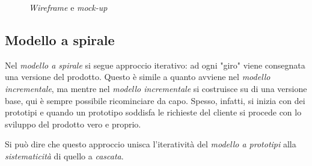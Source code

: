 \documentclass[12pt, a4paper]{report}
\theoremstyle{def}
\theoremstyle{definition}
\begin{document}
\begin{figure}[h]
    \centering
    \hfill
    \caption{\emph{Wireframe} e \emph{mock-up}}
\end{figure}

\newpage
\subsection{Modello a spirale}
Nel \emph{modello a spirale} si segue approccio iterativo: ad ogni "giro" viene
consegnata una versione del prodotto. Questo è simile a quanto avviene nel
\emph{modello incrementale}, ma mentre nel \emph{modello incrementale} si
costruisce su di una versione base, qui è sempre possibile ricominciare da capo.
Spesso, infatti, si inizia con dei prototipi e quando un prototipo soddisfa le
richieste del cliente si procede con lo sviluppo del prodotto vero e proprio.

Si può dire che questo approccio unisca l'iteratività del \emph{modello a
prototipi} alla \emph{sistematicità} di quello a \emph{cascata}.
\end{document}
